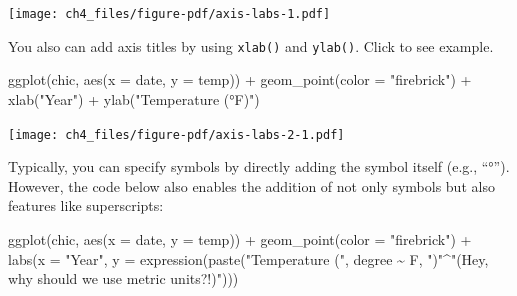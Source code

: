 \documentclass[
  letterpaper,
]{scrbook}
\newenvironment{Shaded}{\begin{snugshade}}{\end{snugshade}}
\newcommand{\AttributeTok}[1]{\textcolor[rgb]{0.40,0.45,0.13}{#1}}
\newcommand{\FunctionTok}[1]{\textcolor[rgb]{0.28,0.35,0.67}{#1}}
\newcommand{\NormalTok}[1]{\textcolor[rgb]{0.00,0.23,0.31}{#1}}
\newcommand{\SpecialCharTok}[1]{\textcolor[rgb]{0.37,0.37,0.37}{#1}}
\newcommand{\StringTok}[1]{\textcolor[rgb]{0.13,0.47,0.30}{#1}}
\begin{document}
\texttt{[image: ch4\_files/figure-pdf/axis-labs-1.pdf]}

\begin{tcolorbox}[enhanced jigsaw, toprule=.15mm, bottomtitle=1mm, coltitle=black, breakable, colbacktitle=quarto-callout-tip-color!10!white, opacityback=0, toptitle=1mm, colframe=quarto-callout-tip-color-frame, titlerule=0mm, title=\textcolor{quarto-callout-tip-color}{\faLightbulb}\hspace{0.5em}{\texttt{xlab()} and \texttt{ylab()}}, bottomrule=.15mm, arc=.35mm, opacitybacktitle=0.6, leftrule=.75mm, left=2mm, rightrule=.15mm, colback=white]

You also can add axis titles by using \texttt{xlab()} and
\texttt{ylab()}. Click to see example.

\begin{Shaded}
\begin{Highlighting}[]
\FunctionTok{ggplot}\NormalTok{(chic, }\FunctionTok{aes}\NormalTok{(}\AttributeTok{x =}\NormalTok{ date, }\AttributeTok{y =}\NormalTok{ temp)) }\SpecialCharTok{+}
  \FunctionTok{geom\_point}\NormalTok{(}\AttributeTok{color =} \StringTok{"firebrick"}\NormalTok{) }\SpecialCharTok{+}
  \FunctionTok{xlab}\NormalTok{(}\StringTok{"Year"}\NormalTok{) }\SpecialCharTok{+}
  \FunctionTok{ylab}\NormalTok{(}\StringTok{"Temperature (°F)"}\NormalTok{)}
\end{Highlighting}
\end{Shaded}

\texttt{[image: ch4\_files/figure-pdf/axis-labs-2-1.pdf]}

\end{tcolorbox}

Typically, you can specify symbols by directly adding the symbol itself
(e.g., ``°''). However, the code below also enables the addition of not
only symbols but also features like superscripts:

\begin{Shaded}
\begin{Highlighting}[]
\FunctionTok{ggplot}\NormalTok{(chic, }\FunctionTok{aes}\NormalTok{(}\AttributeTok{x =}\NormalTok{ date, }\AttributeTok{y =}\NormalTok{ temp)) }\SpecialCharTok{+}
  \FunctionTok{geom\_point}\NormalTok{(}\AttributeTok{color =} \StringTok{"firebrick"}\NormalTok{) }\SpecialCharTok{+}
  \FunctionTok{labs}\NormalTok{(}\AttributeTok{x =} \StringTok{"Year"}\NormalTok{, }\AttributeTok{y =} \FunctionTok{expression}\NormalTok{(}\FunctionTok{paste}\NormalTok{(}\StringTok{"Temperature ("}\NormalTok{, degree }\SpecialCharTok{\textasciitilde{}}\NormalTok{ F, }\StringTok{")"}\SpecialCharTok{\^{}}\StringTok{"(Hey, why should we use metric units?!)"}\NormalTok{)))}
\end{Highlighting}
\end{Shaded}
\end{document}
